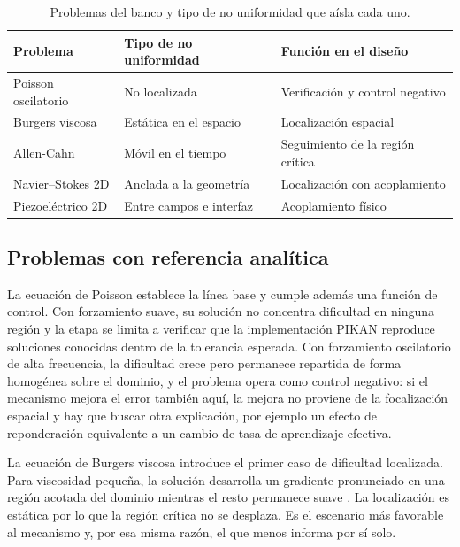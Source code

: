 \begin{table}[htbp]
\centering
\caption{Problemas del banco y tipo de no uniformidad que aísla cada uno.}
\label{tab:escalera}
\begin{tabular}{lll}
\toprule
Problema & Tipo de no uniformidad & Función en el diseño \\
\midrule
Poisson oscilatorio & No localizada           & Verificación y control negativo \\
Burgers viscosa     & Estática en el espacio  & Localización espacial \\
Allen-Cahn          & Móvil en el tiempo      & Seguimiento de la región crítica \\
Navier--Stokes 2D   & Anclada a la geometría  & Localización con acoplamiento \\
Piezoeléctrico 2D   & Entre campos e interfaz & Acoplamiento físico \\
\bottomrule
\end{tabular}
\end{table}

\subsection{Problemas con referencia analítica}

La ecuación de Poisson establece la línea base y cumple además una
función de control. Con forzamiento suave, su solución no concentra
dificultad en ninguna región y la etapa se limita a verificar que la
implementación PIKAN reproduce soluciones conocidas dentro de la
tolerancia esperada. Con forzamiento oscilatorio de alta frecuencia, la
dificultad crece pero permanece repartida de forma homogénea sobre el
dominio, y el problema opera como control negativo: si el mecanismo
mejora el error también aquí, la mejora no proviene de la focalización
espacial y hay que buscar otra explicación, por ejemplo un efecto de
reponderación equivalente a un cambio de tasa de aprendizaje efectiva.

La ecuación de Burgers viscosa introduce el primer caso de dificultad
localizada. Para viscosidad pequeña, la solución desarrolla un gradiente
pronunciado en una región acotada del dominio mientras el resto permanece
suave \cite{raissi2019}. La localización es estática por lo que la región
crítica no se desplaza. Es el escenario más favorable al mecanismo y, por
esa misma razón, el que menos informa por sí solo.

